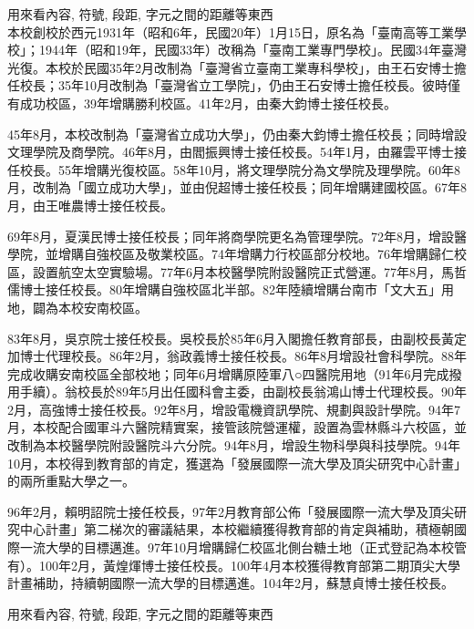 
\newpage
{}
用來看內容, 符號, 段距, 字元之間的距離等東西\\

本校創校於西元1931年（昭和6年，民國20年）1月15日，原名為「臺南高等工業學校」；1944年（昭和19年，民國33年）改稱為「臺南工業專門學校」。民國34年臺灣光復。本校於民國35年2月改制為「臺灣省立臺南工業專科學校」，由王石安博士擔任校長；35年10月改制為「臺灣省立工學院」，仍由王石安博士擔任校長。彼時僅有成功校區，39年增購勝利校區。41年2月，由秦大鈞博士接任校長。

45年8月，本校改制為「臺灣省立成功大學」，仍由秦大鈞博士擔任校長；同時增設文理學院及商學院。46年8月，由閻振興博士接任校長。54年1月，由羅雲平博士接任校長。55年增購光復校區。58年10月，將文理學院分為文學院及理學院。60年8月，改制為「國立成功大學」，並由倪超博士接任校長；同年增購建國校區。67年8月，由王唯農博士接任校長。

69年8月，夏漢民博士接任校長；同年將商學院更名為管理學院。72年8月，增設醫學院，並增購自強校區及敬業校區。74年增購力行校區部分校地。76年增購歸仁校區，設置航空太空實驗場。77年6月本校醫學院附設醫院正式營運。77年8月，馬哲儒博士接任校長。80年增購自強校區北半部。82年陸續增購台南市「文大五」用地，闢為本校安南校區。

83年8月，吳京院士接任校長。吳校長於85年6月入閣擔任教育部長，由副校長黃定加博士代理校長。86年2月，翁政義博士接任校長。86年8月增設社會科學院。88年完成收購安南校區全部校地；同年6月增購原陸軍八○四醫院用地（91年6月完成撥用手續）。翁校長於89年5月出任國科會主委，由副校長翁鴻山博士代理校長。90年2月，高強博士接任校長。92年8月，增設電機資訊學院、規劃與設計學院。94年7月，本校配合國軍斗六醫院精實案，接管該院營運權，設置為雲林縣斗六校區，並改制為本校醫學院附設醫院斗六分院。94年8月，增設生物科學與科技學院。94年10月，本校得到教育部的肯定，獲選為「發展國際一流大學及頂尖研究中心計畫」的兩所重點大學之一。

96年2月，賴明詔院士接任校長，97年2月教育部公佈「發展國際一流大學及頂尖研究中心計畫」第二梯次的審議結果，本校繼續獲得教育部的肯定與補助，積極朝國際一流大學的目標邁進。97年10月增購歸仁校區北側台糖土地（正式登記為本校管有）。100年2月，黃煌煇博士接任校長。100年4月本校獲得教育部第二期頂尖大學計畫補助，持續朝國際一流大學的目標邁進。104年2月，蘇慧貞博士接任校長。


\newpage
{}
用來看內容, 符號, 段距, 字元之間的距離等東西\\

